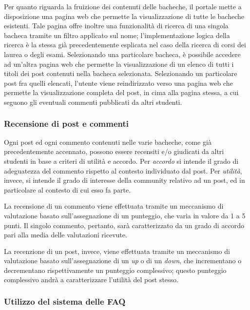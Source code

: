 \documentclass [a4paper,11pt]{book}
\begin{document}
\medskip

Per quanto riguarda la fruizione dei contenuti delle bacheche, il portale mette a disposizione una pagina web che permette la visualizzazione di tutte le bacheche esistenti. Tale pagina offre inoltre una funzionalità di ricerca di una singola bacheca tramite un filtro applicato sul nome; l'implementazione logica della ricerca è la stessa già precedentemente esplicata nel caso della ricerca di corsi dei laurea o degli esami. Selezionando una particolare bacheca, è possibile accedere ad un'altra pagina web che permette la visualizzazione di un elenco di tutti i titoli dei post contenuti nella bacheca selezionata. Selezionando un particolare post fra quelli elencati, l'utente viene reindirizzato verso una pagina web che permette la visualizzazione completa del post, in cima alla pagina stessa, a cui seguono gli eventuali commenti pubblicati da altri studenti. 

\medskip

\subsubsection{Recensione di post e commenti}

Ogni post ed ogni commento contenuti nelle varie bacheche, come già precedentemente accennato, possono essere recensiti e/o giudicati da altri studenti in base a criteri di utilità e accordo. Per \emph{accordo} si intende il grado di adeguatezza del commento rispetto al contesto individuato dal post. Per \emph{utilità}, invece, si intende il grado di interesse della community relativo ad un post, ed in particolare al contesto di cui esso fa parte.

La recensione di un commento viene effettuata tramite un meccanismo di valutazione basato sull'assegnazione di un punteggio, che varia in valore da 1 a 5 punti. Il singolo commento, pertanto, sarà caratterizzato da un grado di accordo pari alla media delle valutazioni ricevute.

La recenzione di un post, invece, viene effettuata tramite un meccanismo di valutazione basato sull'assegnazione di un \emph{up} o di un \emph{down}, che incrementano o decrementano rispettivamente un punteggio complessivo; questo punteggio complessivo andrà a caratterizzare l'utilità del post stesso.

\medskip

\subsubsection{Utilizzo del sistema delle FAQ}
\end{document}
